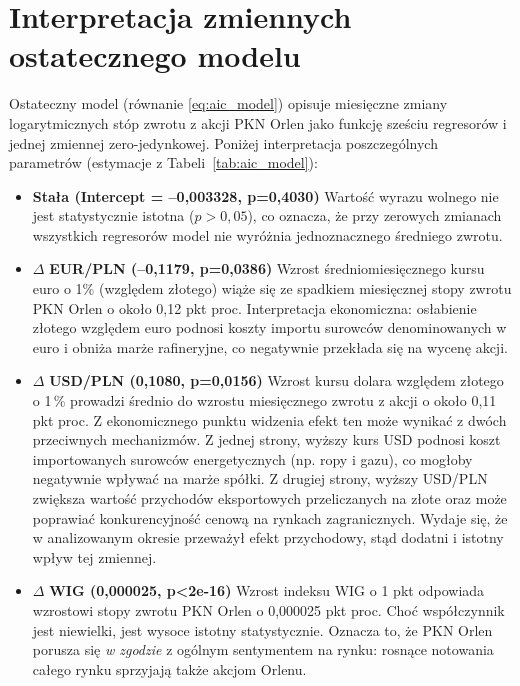 \documentclass[12pt, twoside]{article}
\begin{document}
\section{Interpretacja zmiennych ostatecznego modelu}
Ostateczny model (równanie \ref{eq:aic_model}) opisuje miesięczne zmiany logarytmicznych stóp zwrotu z akcji PKN Orlen jako funkcję sześciu regresorów i jednej zmiennej zero-jedynkowej. Poniżej interpretacja poszczególnych parametrów (estymacje z Tabeli~\ref{tab:aic_model}):

\begin{itemize}
  \item \textbf{Stała (Intercept = –0,003328, p=0,4030)}  
    Wartość wyrazu wolnego nie jest statystycznie istotna ($p>0{,}05$), co oznacza, że przy zerowych zmianach wszystkich regresorów model nie wyróżnia jednoznacznego średniego zwrotu.

  \item \(\Delta\) \textbf{EUR/PLN (–0,1179, p=0,0386)}  
    Wzrost średniomiesięcznego kursu euro o 1\% (względem złotego) wiąże się ze spadkiem miesięcznej stopy zwrotu PKN Orlen o około 0,12 pkt proc. Interpretacja ekonomiczna: osłabienie złotego względem euro podnosi koszty importu surowców denominowanych w euro i obniża marże rafineryjne, co negatywnie przekłada się na wycenę akcji.

  \item \(\Delta\) \textbf{USD/PLN (0{,}1080, p=0{,}0156)}  
Wzrost kursu dolara względem złotego o 1\,\% prowadzi średnio do wzrostu miesięcznego zwrotu z akcji o około 0{,}11 pkt proc. Z ekonomicznego punktu widzenia efekt ten może wynikać z dwóch przeciwnych mechanizmów. Z jednej strony, wyższy kurs USD podnosi koszt importowanych surowców energetycznych (np. ropy i gazu), co mogłoby negatywnie wpływać na marże spółki. Z drugiej strony, wyższy USD/PLN zwiększa wartość przychodów eksportowych przeliczanych na złote oraz może poprawiać konkurencyjność cenową na rynkach zagranicznych. Wydaje się, że w analizowanym okresie przeważył efekt przychodowy, stąd dodatni i istotny wpływ tej zmiennej.


  \item \(\Delta\) \textbf{WIG (0,000025, p<2e-16)}  
    Wzrost indeksu WIG o 1 pkt odpowiada wzrostowi stopy zwrotu PKN Orlen o 0,000025 pkt proc. Choć współczynnik jest niewielki, jest wysoce istotny statystycznie. Oznacza to, że PKN Orlen porusza się \emph{w zgodzie} z ogólnym sentymentem na rynku: rosnące notowania całego rynku sprzyjają także akcjom Orlenu.


\end{itemize}
\end{document}
